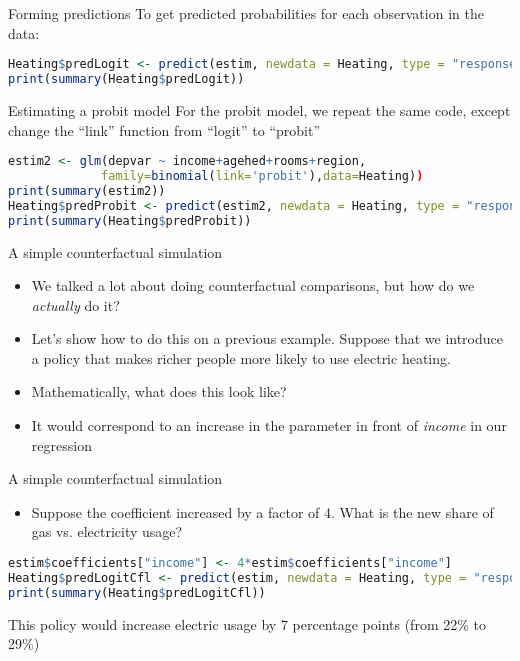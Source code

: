 \documentclass[english,aspectratio=169,12pt,xcolor=dvipsnames]{beamer}
\begin{document}
\begin{frame}[fragile]{Forming predictions}
To get predicted probabilities for each observation in the data:

\begin{lstlisting}[language=R]
Heating$predLogit <- predict(estim, newdata = Heating, type = "response")
print(summary(Heating$predLogit))
\end{lstlisting}

\end{frame}





\begin{frame}[fragile]{Estimating a probit model}
For the probit model, we repeat the same code, except change the ``link'' function from ``logit'' to ``probit''

\begin{lstlisting}[language=R]
estim2 <- glm(depvar ~ income+agehed+rooms+region,
             family=binomial(link='probit'),data=Heating))
print(summary(estim2))
Heating$predProbit <- predict(estim2, newdata = Heating, type = "response")
print(summary(Heating$predProbit))
\end{lstlisting}

\end{frame}



\begin{frame}{A simple counterfactual simulation}
\begin{itemize}
\item We talked a lot about doing counterfactual comparisons, but how do we \emph{actually} do it?
\item Let's show how to do this on a previous example. Suppose that we introduce a policy that makes richer people more likely to use electric heating.
\item Mathematically, what does this look like?
\item It would correspond to an increase in the parameter in front of \emph{income} in our regression
\end{itemize}
\end{frame}



\begin{frame}[fragile]{A simple counterfactual simulation}
\begin{itemize}
\item Suppose the coefficient increased by a factor of 4. What is the new share of gas vs. electricity usage?
\end{itemize}

\begin{lstlisting}[language=R]
estim$coefficients["income"] <- 4*estim$coefficients["income"]
Heating$predLogitCfl <- predict(estim, newdata = Heating, type = "response")
print(summary(Heating$predLogitCfl))
\end{lstlisting}

This policy would increase electric usage by 7 percentage points (from 22\% to 29\%)

\end{frame}
\end{document}
